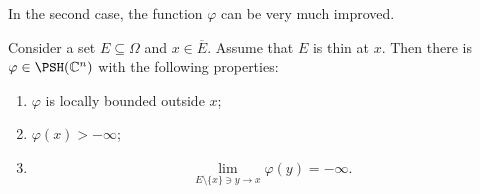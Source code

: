 In the second case, the function $\varphi$ can be very much improved.
\begin{proposition}\label{prop:BTthin}
  Consider a set $E\subseteq \Omega$ and $x\in \overline{E}$. Assume that $E$ is thin at $x$. Then there is $\varphi\in \PSH(\mathbb{C}^n)$ with the following properties:
  \begin{enumerate}
    \item\label{itm:prop:BTthin:1} $\varphi$ is locally bounded outside $x$;
    \item\label{itm:prop:BTthin:2} $\varphi(x)>-\infty$;
    \item\label{itm:prop:BTthin:3}
    \[
    \lim_{E\setminus\{x\} \ni y\to x} \varphi(y)=-\infty.
    \]
  \end{enumerate}
\end{proposition}
